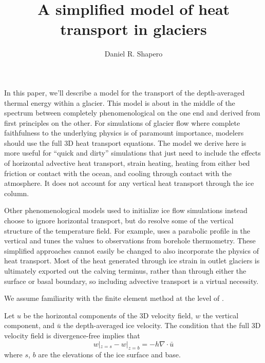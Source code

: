\documentclass{article}
\title{A simplified model of heat transport in glaciers}
\author{Daniel R. Shapero}
\date{}
\theoremstyle{definition}
\theoremstyle{plain}
\begin{document}
\maketitle

In this paper, we'll describe a model for the transport of the depth-averaged thermal energy within a glacier.
This model is about in the middle of the spectrum between completely phenomenological on the one end and derived from first principles on the other.
For simulations of glacier flow where complete faithfulness to the underlying physics is of paramount importance, modelers should use the full 3D heat transport equations.
The model we derive here is more useful for ``quick and dirty'' simulations that just need to include the effects of horizontal advective heat transport, strain heating, heating from either bed friction or contact with the ocean, and cooling through contact with the atmosphere.
It does not account for any vertical heat transport through the ice column.

Other phenomenological models used to initialize ice flow simulations instead choose to ignore horizontal transport, but do resolve some of the vertical structure of the temperature field.
For example, \citet{humbert2005parameter} uses a parabolic profile in the vertical and tunes the values to observations from borehole thermometry.
These simplified approaches cannot easily be changed to also incorporate the physics of heat transport.
Most of the heat generated through ice strain in outlet glaciers is ultimately exported out the calving terminus, rather than through either the surface or basal boundary, so including advective transport is a virtual necessity.

We assume familiarity with the finite element method at the level of \citet{braess2007finite}.

Let $u$ be the horizontal components of the 3D velocity field, $w$ the vertical component, and $\bar u$ the depth-averaged ice velocity.
The condition that the full 3D velocity field is divergence-free implies that
\begin{equation}
    w|_{z = s} - w|_{z = b} = -h\nabla\cdot\bar u
    \label{eq:vertical-velocity-difference}
\end{equation}
where $s$, $b$ are the elevations of the ice surface and base.
\end{document}
